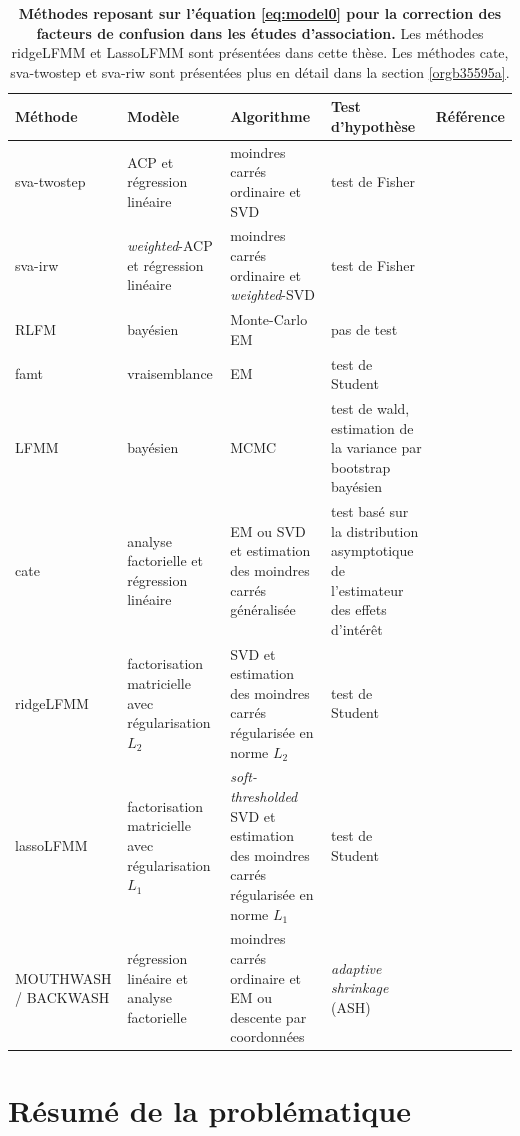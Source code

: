 \documentclass[12pt,a4paper,twoside]{ugathesis}
\begin{document}
\begin{table}
\caption{\label{tab:orgc3cd3d3}
\textbf{Méthodes reposant sur l'équation \ref{eq:model0} pour la correction des facteurs de confusion dans les études d'association.} Les méthodes ridgeLFMM et LassoLFMM sont présentées dans cette thèse. Les méthodes cate, sva-twostep et sva-riw sont présentées plus en détail dans la section \ref{orgb35595a}.}
\centering
\begin{tabular}{p{3cm}|p{4.2cm}p{4cm}p{5cm}|p{4cm}}
\hline
Méthode & Modèle & Algorithme & Test d'hypothèse & Référence\\
\hline
sva-twostep & ACP et régression linéaire & moindres carrés ordinaire et SVD & test de Fisher & \citet{article_Leek_Storey_2007}\\
sva-irw & \emph{weighted}-ACP et régression linéaire & moindres carrés ordinaire et \emph{weighted}-SVD & test de Fisher & \citet{article_Leek_Storey_2008}\\
RLFM & bayésien & Monte-Carlo EM & pas de test & \citet{agarwal09_regres}\\
famt & vraisemblance & EM & test de Student & \citet{friguet09_factor_model_approac_to_multip}\\
LFMM & bayésien & MCMC & test de wald, estimation de la variance par bootstrap bayésien & \citet{Frichot_2013}\\
cate & analyse factorielle et régression linéaire & EM ou SVD et estimation des moindres carrés généralisée & test basé sur la distribution asymptotique de l'estimateur des effets d'intérêt & \citet{wang2015confounder}\\
ridgeLFMM & factorisation matricielle avec régularisation \(L_{2}\) & SVD et estimation des moindres carrés régularisée en norme \(L_{2}\) & test de Student & \\
lassoLFMM & factorisation matricielle avec régularisation \(L_{1}\) & \emph{soft-thresholded} SVD et estimation des moindres carrés régularisée en norme \(L_{1}\) & test de Student & \\
MOUTHWASH / BACKWASH & régression linéaire et analyse factorielle & moindres carrés ordinaire et EM ou descente par coordonnées & \emph{adaptive shrinkage} (ASH) \citep{stephens16_false_discov_rates} & \citet{gerard2017empirical}\\
\end{tabular}
\end{table}

\section{Résumé de la problématique}
\label{sec:org9727393}
\end{document}
